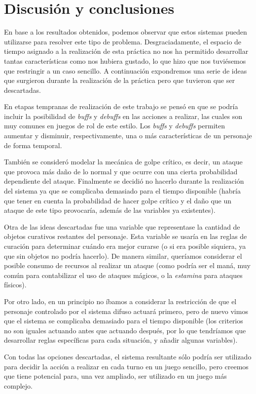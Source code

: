 \section{Discusión y conclusiones}
En base a los resultados obtenidos, podemos observar que estos sistemas pueden utilizarse para resolver este tipo de problema. Desgraciadamente, el espacio de tiempo asignado a la realización de esta práctica no nos ha permitido desarrollar tantas características como nos hubiera gustado, lo que hizo que nos tuviésemos que restringir a un caso sencillo. A continuación expondremos una serie de ideas que surgieron durante la realización de la práctica pero que tuvieron que ser descartadas.

En etapas tempranas de realización de este trabajo se pensó en que se podría incluir la posibilidad de \textit{buffs} y \textit{debuffs} en las acciones a realizar, las cuales son muy comunes en juegos de rol de este estilo. Los \textit{buffs} y \textit{debuffs} permiten aumentar y disminuir, respectivamente, una o más características de un personaje de forma temporal.

También se consideró modelar la mecánica de golpe crítico, es decir, un ataque que provoca más daño de lo normal y que ocurre con una cierta probabilidad dependiente del ataque. Finalmente se decidió no hacerlo durante la realización del sistema ya que se complicaba demasiado para el tiempo disponible (habría que tener en cuenta la probabilidad de hacer golpe crítico y el daño que un ataque de este tipo provocaría, además de las variables ya existentes).

Otra de las ideas descartadas fue una variable que representase la cantidad de objetos curativos restantes del personaje. Esta variable se usaría en las reglas de curación para determinar cuándo era mejor curarse (o si era posible siquiera, ya que sin objetos no podría hacerlo). De manera similar, queríamos considerar el posible consumo de recursos al realizar un ataque (como podría ser el maná, muy común para contabilizar el uso de ataques mágicos, o la \textit{estamina} para ataques físicos). 

Por otro lado, en un principio no íbamos a considerar la restricción de que el personaje controlado por el sistema difuso actuará primero, pero de nuevo vimos que el sistema se complicaba demasiado para el tiempo disponible (los criterios no son iguales actuando antes que actuando después, por lo que tendríamos que desarrollar reglas específicas para cada situación, y añadir algunas variables).

Con todas las opciones descartadas, el sistema resultante sólo podría ser utilizado para decidir la acción a realizar en cada turno en un juego sencillo, pero creemos que tiene potencial para, una vez ampliado, ser utilizado en un juego más complejo.